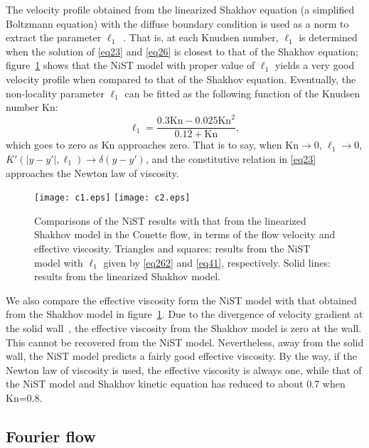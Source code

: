 \documentclass[lineno]{jfm}
\begin{document}
\newpage 
The velocity profile obtained from the linearized Shakhov equation (a simplified Boltzmann equation) with the diffuse boundary condition is used as a norm to extract the parameter $\ell_1$~\citep{Lei2022}. That is, at each Knudsen number, $\ell_1$ is determined when the solution of \eqref{eq23} and \eqref{eq26} is closest to that of the Shakhov equation; figure~\ref{resultc} shows that the NiST model with proper value of $\ell_1$ yields a very good velocity profile when compared to that of the Shakhov equation. Eventually, the non-locality parameter $\ell_1$ can be fitted as the following function of the Knudsen number $\text{Kn}$:
\begin{equation}\label{eq262}
\ell_1 = \frac{0.3 \text{Kn} - 0.025 \text{Kn}^2}{0.12+\text{Kn}},
\end{equation}
which goes to zero as $\text{Kn}$ approaches zero. That is to say, when $\text{Kn}\rightarrow0$, $\ell_1\rightarrow0$, $K'(|y - y'|,\ell_1)\rightarrow\delta(y-y')$, and the constitutive relation in \eqref{eq23} approaches the Newton law of viscosity. 

\begin{figure}
	\centering
	{\texttt{[image: c1.eps]} }
	{\texttt{[image: c2.eps]} }
	\caption{Comparisons of the NiST results with that from the linearized Shakhov model in the Couette flow, in terms of the flow velocity and effective viscosity. Triangles and squares: results from the NiST model with $\ell_1$ given by \eqref{eq262} and \eqref{eq41}, respectively. Solid lines:  results from the linearized Shakhov model.
	}
	\label{resultc}
\end{figure}

We also compare the effective viscosity form the NiST model with that obtained from the Shakhov model in figure~\ref{resultc}. Due to the divergence of velocity gradient at the solid wall~\citep{takata2022JFM}, the effective viscosity from the Shakhov model is zero at the wall. This cannot be recovered from the NiST model. Nevertheless, away from the solid wall, the NiST model predicts a fairly good effective viscosity. By the way, if the Newton law of viscosity is used, the effective viscosity is always one, while that of the NiST model and Shakhov kinetic equation has reduced to about 0.7 when Kn=0.8.


\subsection{Fourier flow}
\end{document}
